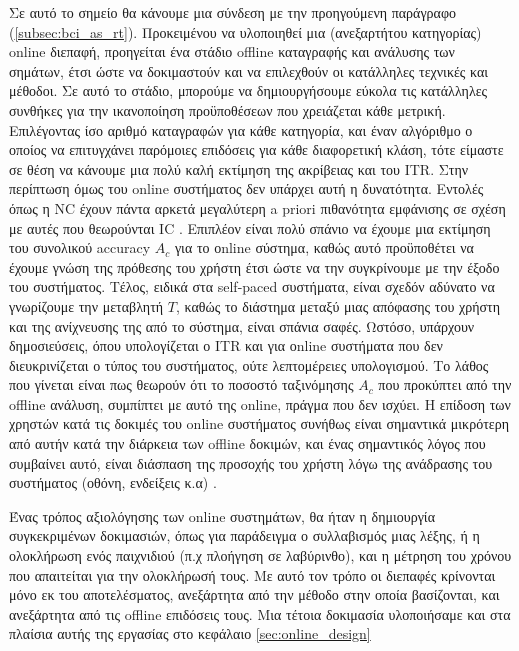 \documentclass[11pt,a4paper,english,greek,twoside]{../Thesis}
\begin{document}
  \par Σε αυτό το σημείο θα κάνουμε μια σύνδεση με την προηγούμενη παράγραφο (\ref{subsec:bci_as_rt}). Προκειμένου να υλοποιηθεί μια (ανεξαρτήτου κατηγορίας) online διεπαφή, προηγείται ένα στάδιο offline καταγραφής και ανάλυσης των σημάτων, έτσι ώστε να δοκιμαστούν και να επιλεχθούν οι κατάλληλες τεχνικές και μέθοδοι. Σε αυτό το στάδιο, μπορούμε να δημιουργήσουμε εύκολα τις κατάλληλες συνθήκες για την ικανοποίηση προϋποθέσεων που χρειάζεται κάθε μετρική. Επιλέγοντας ίσο αριθμό καταγραφών για κάθε κατηγορία, και έναν αλγόριθμο ο οποίος να επιτυγχάνει παρόμοιες επιδόσεις για κάθε διαφορετική κλάση, τότε είμαστε σε θέση να κάνουμε μια πολύ καλή εκτίμηση της ακρίβειας και του ITR. Στην περίπτωση όμως του online συστήματος δεν υπάρχει αυτή η δυνατότητα. Εντολές όπως η NC έχουν πάντα αρκετά  μεγαλύτερη a priori πιθανότητα εμφάνισης σε σχέση με αυτές που θεωρούνται IC \cite{Mason2006-ts}. Επιπλέον είναι πολύ σπάνιο να έχουμε μια εκτίμηση του συνολικού accuracy $A_c$ για το οnline σύστημα, καθώς αυτό προϋποθέτει να έχουμε γνώση της πρόθεσης του χρήστη έτσι ώστε να την συγκρίνουμε με την έξοδο του συστήματος. Τέλος, ειδικά στα self-paced συστήματα, είναι σχεδόν αδύνατο να γνωρίζουμε την μεταβλητή $T$, καθώς το διάστημα μεταξύ μιας απόφασης του χρήστη και της ανίχνευσης της από το σύστημα, είναι σπάνια σαφές. Ωστόσο, υπάρχουν δημοσιεύσεις, όπου υπολογίζεται ο ITR και για οnline συστήματα που δεν διευκρινίζεται ο τύπος του συστήματος, ούτε λεπτομέρειες υπολογισμού. Το λάθος που γίνεται είναι πως θεωρούν ότι το ποσοστό ταξινόμησης $A_c$ που προκύπτει από την offline ανάλυση, συμπίπτει με αυτό της online, πράγμα που δεν ισχύει. Η επίδοση των χρηστών κατά τις δοκιμές του online συστήματος συνήθως είναι σημαντικά μικρότερη από αυτήν κατά την διάρκεια των offline δοκιμών, και ένας σημαντικός λόγος που συμβαίνει αυτό, είναι διάσπαση της προσοχής του χρήστη λόγω της ανάδρασης του συστήματος (οθόνη, ενδείξεις κ.α)\cite{Muller-Putz2006-wj} \cite{Yuan2013-jp}.
  \par Ένας τρόπος αξιολόγησης των online συστημάτων, θα ήταν η δημιουργία συγκεκριμένων δοκιμασιών, όπως για παράδειγμα ο συλλαβισμός μιας λέξης, ή η ολοκλήρωση ενός παιχνιδιού (π.χ πλοήγηση σε λαβύρινθο), και η μέτρηση του χρόνου που απαιτείται για την ολοκλήρωσή τους. Με αυτό τον τρόπο οι διεπαφές κρίνονται μόνο εκ του αποτελέσματος, ανεξάρτητα από την μέθοδο στην οποία βασίζονται, και ανεξάρτητα από τις offline επιδόσεις τους. Μια τέτοια δοκιμασία υλοποιήσαμε και στα πλαίσια αυτής της εργασίας στο κεφάλαιο \ref{sec:online_design}
\end{document}
